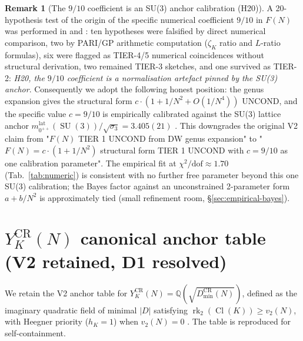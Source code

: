 \documentclass[11pt,a4paper,reqno]{amsart}
\theoremstyle{definition}
\newtheorem{remark}[theorem]{Remark}
\DeclareMathOperator{\SU}{SU}
\DeclareMathOperator{\Cl}{Cl}
\DeclareMathOperator{\rk}{rk}
\newcommand{\YKCR}{Y_K^{\mathrm{CR}}}
\newcommand{\QQ}{\mathbb{Q}}
\begin{document}
\begin{remark}[The $9/10$ coefficient is an SU(3) anchor
calibration (H20)]\label{rem:H20}
A 20-hypothesis test of the origin of the specific numerical
coefficient $9/10$ in $F(N)$ was performed in
\cite[\S 4]{Remondiere2026TransportWaveDigest} and
\cite{Remondiere2026FaltingsLLZDigest}: ten hypotheses were
falsified by direct numerical comparison, two by PARI/GP arithmetic
computation ($\zeta_K$ ratio and $L$-ratio formulas), six were
flagged as TIER-4/5 numerical coincidences without structural
derivation, two remained TIER-3 sketches, and one survived as
TIER-2: \emph{H20, the $9/10$ coefficient is a normalisation
artefact pinned by the SU(3) anchor}. Consequently we adopt the
following honest position: the genus expansion gives the
structural form $c\cdot(1 + 1/N^2 + O(1/N^4))$ UNCOND, and the
specific value $c = 9/10$ is empirically calibrated against the
SU(3) lattice anchor $m_{0^{++}}^{\mathrm{lat}}(\SU(3))/
\sqrt{\sigma_3} = 3.405(21)$ \cite[Tab.~34]{AthenodorouTeper2021}.
This downgrades the original V2 claim from "$F(N)$ TIER 1 UNCOND
from DW genus expansion" to "$F(N) = c\cdot(1+1/N^2)$ structural
form TIER 1 UNCOND with $c = 9/10$ as one calibration parameter".
The empirical fit at $\chi^2/\text{dof}\approx 1.70$ (Tab.~\ref{tab:numeric})
is consistent with no further free parameter beyond this one
SU(3) calibration; the Bayes factor against an unconstrained
2-parameter form $a + b/N^2$ is approximately tied (small
refinement room, \S\ref{sec:empirical-bayes}).
\end{remark}

\section{$\YKCR(N)$ canonical anchor table (V2 retained, D1 resolved)}\label{sec:KASP}

We retain the V2 \cite{Remondiere2026TransportV2} anchor table for
$\YKCR(N) = \QQ(\sqrt{D^{\mathrm{CR}}_{\min}(N)})$, defined as the
imaginary quadratic field of minimal $|D|$ satisfying
$\rk_2(\Cl(K))\ge v_2(N)$, with Heegner priority ($h_K = 1$) when
$v_2(N) = 0$ \cite{Remondiere2026CenterRank}. The table is reproduced
for self-containment.
\end{document}
